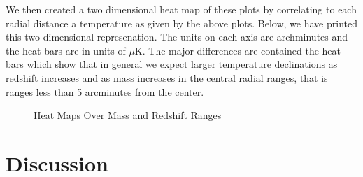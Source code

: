 \documentclass[12pt]{article} %
\begin{document}
We then created a two dimensional heat map of these plots by correlating to each radial distance a temperature as given by the above plots. Below, we have printed this two dimensional represenation. The units on each axis are archminutes and the heat bars are in units of $\mu$K. The major differences are contained the heat bars which show that in general we expect larger temperature declinations as redshift increases and as mass increases in the central radial ranges, that is ranges less than 5 arcminutes from the center. 

\begin{figure}[!ht]
    \hfill
    \hfill
    \vfill
    \hfill
    \hfill
    \vfill
    \hfill
    \hfill
    \caption{Heat Maps Over Mass and Redshift Ranges}
    \label{fig:dummy}
  \end{figure}

\section{Discussion}
\end{document}
